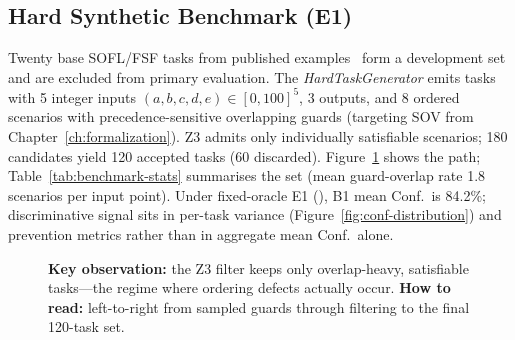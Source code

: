\subsection{Hard Synthetic Benchmark (E1)}

Twenty base SOFL/FSF tasks from published
examples~\citep{liu2004soflbook,li2022qrs_companion} form a development
set and are excluded from primary evaluation.
The \emph{HardTaskGenerator} emits tasks with 5 integer inputs
$(a{,}b{,}c{,}d{,}e)\in[0,100]^5$, 3 outputs, and 8 ordered scenarios with
precedence-sensitive overlapping guards (targeting SOV from
Chapter~\ref{ch:formalization}).
Z3 admits only individually satisfiable scenarios; 180 candidates yield
120 accepted tasks (60 discarded).
Figure~\ref{fig:benchmark-pipeline} shows the path; Table~\ref{tab:benchmark-stats}
summarises the set (mean guard-overlap rate 1.8 scenarios per input point).
Under fixed-oracle E1 (), B1 mean Conf.\ is 84.2\%;
discriminative signal sits in per-task variance
(Figure~\ref{fig:conf-distribution}) and prevention metrics rather than in
aggregate mean Conf.\ alone.

\begin{figure}[t]
  \centering
  \caption{\textbf{Key observation:} the Z3 filter keeps only overlap-heavy,
    satisfiable tasks---the regime where ordering defects actually occur.
    \textbf{How to read:} left-to-right from sampled guards through filtering
    to the final 120-task set.}
  \label{fig:benchmark-pipeline}
\end{figure}

\begin{table}[H]
  \caption{Summary statistics of the 120-task hard benchmark.}
  \label{tab:benchmark-stats}
  \centering
\end{table}

